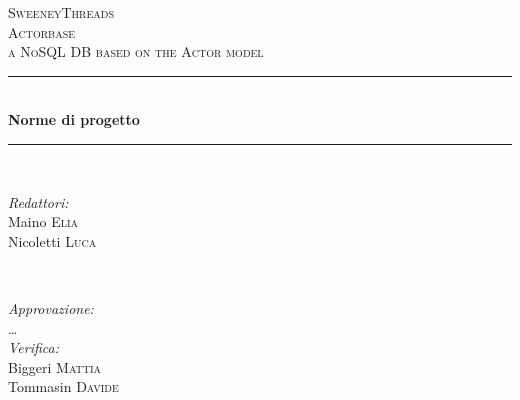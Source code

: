 \documentclass[a4paper]{report}
\begin{document}
	
	\begin{titlepage}
		\newcommand{\HRule}{\rule{\linewidth}{0.5mm}} 
		\center  
		
		\textsc{\LARGE SweeneyThreads}\\[1.5cm] 
		\textsc{\Large Actorbase}\\[0.5cm] 
		\textsc{\large a NoSQL DB based on the Actor model}\\[0.5cm]
		
		
		\HRule \\[0.4cm]
		{ \huge \bfseries Norme di progetto}\\[0.4cm] 
		\HRule \\[1.5cm]
		
		\begin{minipage}{0.4\textwidth}
			\begin{flushleft} \large
				\emph{Redattori:}\\
				Maino \textsc{Elia} \\
				Nicoletti \textsc{Luca} \\
			\end{flushleft}
		\end{minipage}
		~
		\begin{minipage}{0.4\textwidth}
			\begin{flushright} \large
				\emph{Approvazione:} \\
				\dots \\
				\emph{Verifica:} \\
				Biggeri \textsc{Mattia} \\
				Tommasin \textsc{Davide} \\
			\end{flushright}
		\end{minipage}
		

\end{titlepage}
\end{document}
